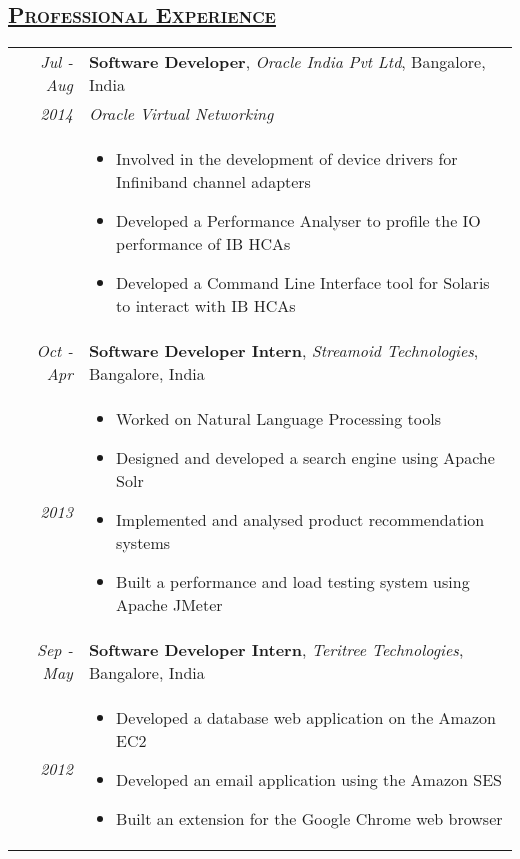 \documentclass[14pt]{article}
\begin{document}
\subsection* {\scshape\LARGE\uline {Professional Experience}}
\large
\begin{tabularx}{\textwidth}{r X}
\emph{Jul - Aug} & \textbf{Software Developer}, \textit{Oracle India Pvt Ltd}, Bangalore, India \\
\emph{2014  \enskip 2016}                & \emph{Oracle Virtual Networking}\\ 
						& \begin{itemize}[noitemsep,topsep=0pt]
			                   \item Involved in the development of device drivers for Infiniband channel adapters
			                   \item Developed a Performance Analyser to profile the IO performance of IB HCAs
			                   \item Developed a Command Line Interface tool for Solaris to interact with IB HCAs
						   \end{itemize}	    
\\ 

\emph{Oct - Apr} & \textbf{Software Developer Intern}, \textit{Streamoid Technologies}, Bangalore, India \\ 
\emph{2013 \enskip 2014}            & \begin{itemize}[noitemsep,topsep=0pt]
						\item Worked on Natural Language Processing tools 
		 	            	\item Designed and developed a search engine using Apache Solr 
   			           	\item Implemented and analysed product recommendation systems 
			           	\item Built a performance and load testing system using Apache JMeter
					      \end{itemize}
\\ 

\emph{Sep - May} & \textbf{Software Developer Intern}, \textit{Teritree Technologies}, Bangalore, India \\ 
\emph{2012 \enskip 2013}            & \begin{itemize}[noitemsep,topsep=0pt]
						\item Developed a database web application on the Amazon EC2 
			            	\item Developed an email application using the Amazon SES
			            	\item Built an extension for the Google Chrome web browser	    
						\end{itemize}
\end{tabularx}
\end{document}
